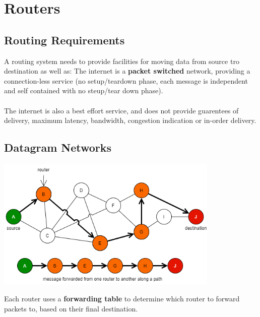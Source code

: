 \section{Routers}
\subsection{Routing Requirements}
A routing system needs to provide facilities for moving data from source tro destination as well as:
The internet is a \textbf{packet switched} network, providing a connection-less service (no setup/teardown phase, each message is independent and self contained with no steup/tear down phase).
\\
\\ The internet is also a best effort service, and does not provide guarentees of delivery, maximum latency, bandwidth, congestion indication or in-order delivery.
\subsection{Datagram Networks}
\begin{center}\includegraphics[width=0.8\textwidth]{network_layer/images/datagram networks}\end{center}
Each router uses a \textbf{forwarding table} to determine which router to forward packets to, based on their final destination.
